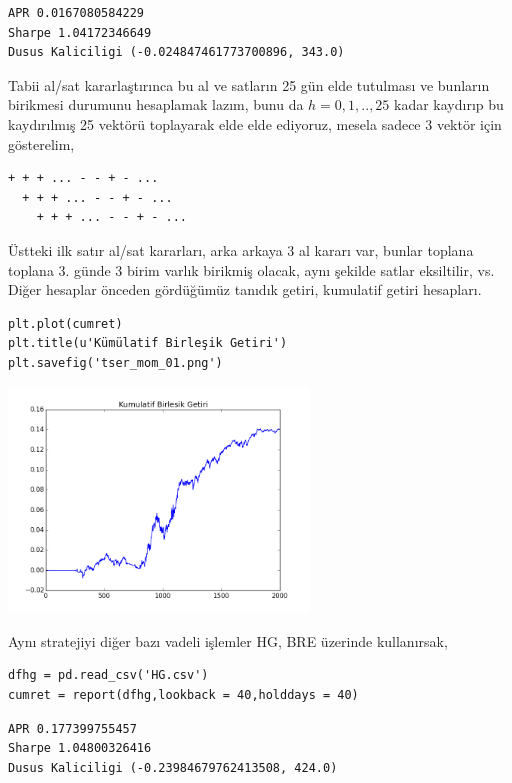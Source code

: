 \documentclass[12pt,fleqn]{article}\usepackage{../../common}
\begin{document}
\begin{verbatim}
APR 0.0167080584229
Sharpe 1.04172346649
Dusus Kaliciligi (-0.024847461773700896, 343.0)
\end{verbatim}

Tabii al/sat kararlaştırınca bu al ve satların 25 gün elde tutulması ve
bunların birikmesi durumunu hesaplamak lazım, bunu da $h=0,1,..,25$ kadar
kaydırıp bu kaydırılmış 25 vektörü toplayarak elde elde ediyoruz, mesela
sadece 3 vektör için gösterelim,

\begin{verbatim}
+ + + ... - - + - ...
  + + + ... - - + - ...
    + + + ... - - + - ...
\end{verbatim}

Üstteki ilk satır al/sat kararları, arka arkaya 3 al kararı var, bunlar
toplana toplana 3. günde 3 birim varlık birikmiş olacak, aynı şekilde
satlar eksiltilir, vs. Diğer hesaplar önceden gördüğümüz tanıdık getiri,
kumulatif getiri hesapları.

\begin{verbatim}
plt.plot(cumret)
plt.title(u'Kümülatif Birleşik Getiri')
plt.savefig('tser_mom_01.png')
\end{verbatim}

\includegraphics[height=6cm]{tser_mom_01.png}

Aynı stratejiyi diğer bazı vadeli işlemler HG, BRE üzerinde kullanırsak,

\begin{verbatim}
dfhg = pd.read_csv('HG.csv')
cumret = report(dfhg,lookback = 40,holddays = 40)
\end{verbatim}

\begin{verbatim}
APR 0.177399755457
Sharpe 1.04800326416
Dusus Kaliciligi (-0.23984679762413508, 424.0)
\end{verbatim}
\end{document}
